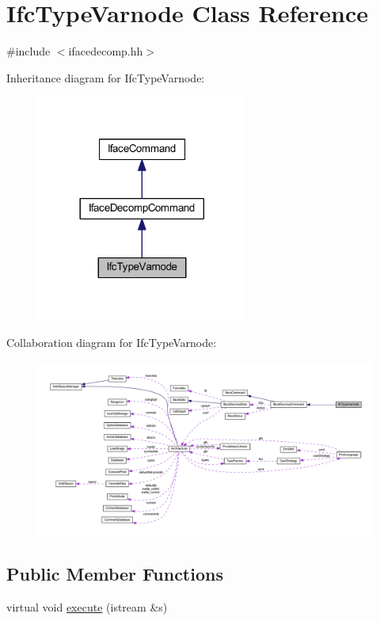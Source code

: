 \hypertarget{class_ifc_type_varnode}{}\section{Ifc\+Type\+Varnode Class Reference}
\label{class_ifc_type_varnode}


{\ttfamily \#include $<$ifacedecomp.\+hh$>$}



Inheritance diagram for Ifc\+Type\+Varnode\+:
\nopagebreak
\begin{figure}[H]
\begin{center}
\leavevmode
\includegraphics[width=197pt]{class_ifc_type_varnode__inherit__graph}
\end{center}
\end{figure}


Collaboration diagram for Ifc\+Type\+Varnode\+:
\nopagebreak
\begin{figure}[H]
\begin{center}
\leavevmode
\includegraphics[width=350pt]{class_ifc_type_varnode__coll__graph}
\end{center}
\end{figure}
\subsection*{Public Member Functions}
\begin{DoxyCompactItemize}
\item 
virtual void \mbox{\hyperlink{class_ifc_type_varnode_a121ff1e507f74d6ec86a07e120cd3ba8}{execute}} (istream \&s)
\end{DoxyCompactItemize}
